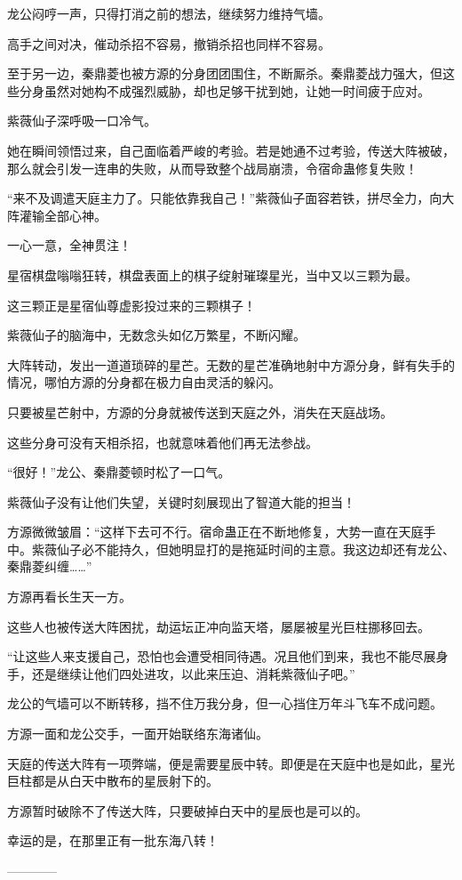 \begin{this_body}
龙公闷哼一声，只得打消之前的想法，继续努力维持气墙。

高手之间对决，催动杀招不容易，撤销杀招也同样不容易。

至于另一边，秦鼎菱也被方源的分身团团围住，不断厮杀。秦鼎菱战力强大，但这些分身虽然对她构不成强烈威胁，却也足够干扰到她，让她一时间疲于应对。

紫薇仙子深呼吸一口冷气。

她在瞬间领悟过来，自己面临着严峻的考验。若是她通不过考验，传送大阵被破，那么就会引发一连串的失败，从而导致整个战局崩溃，令宿命蛊修复失败！

“来不及调遣天庭主力了。只能依靠我自己！”紫薇仙子面容若铁，拼尽全力，向大阵灌输全部心神。

一心一意，全神贯注！

星宿棋盘嗡嗡狂转，棋盘表面上的棋子绽射璀璨星光，当中又以三颗为最。

这三颗正是星宿仙尊虚影投过来的三颗棋子！

紫薇仙子的脑海中，无数念头如亿万繁星，不断闪耀。

大阵转动，发出一道道琐碎的星芒。无数的星芒准确地射中方源分身，鲜有失手的情况，哪怕方源的分身都在极力自由灵活的躲闪。

只要被星芒射中，方源的分身就被传送到天庭之外，消失在天庭战场。

这些分身可没有天相杀招，也就意味着他们再无法参战。

“很好！”龙公、秦鼎菱顿时松了一口气。

紫薇仙子没有让他们失望，关键时刻展现出了智道大能的担当！

方源微微皱眉：“这样下去可不行。宿命蛊正在不断地修复，大势一直在天庭手中。紫薇仙子必不能持久，但她明显打的是拖延时间的主意。我这边却还有龙公、秦鼎菱纠缠……”

方源再看长生天一方。

这些人也被传送大阵困扰，劫运坛正冲向监天塔，屡屡被星光巨柱挪移回去。

“让这些人来支援自己，恐怕也会遭受相同待遇。况且他们到来，我也不能尽展身手，还是继续让他们四处进攻，以此来压迫、消耗紫薇仙子吧。”

龙公的气墙可以不断转移，挡不住万我分身，但一心挡住万年斗飞车不成问题。

方源一面和龙公交手，一面开始联络东海诸仙。

天庭的传送大阵有一项弊端，便是需要星辰中转。即便是在天庭中也是如此，星光巨柱都是从白天中散布的星辰射下的。

方源暂时破除不了传送大阵，只要破掉白天中的星辰也是可以的。

幸运的是，在那里正有一批东海八转！

------------

\end{this_body}

